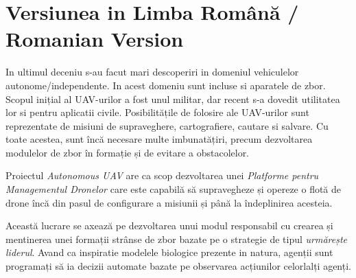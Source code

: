
\section{Versiunea in Limba Română / Romanian Version}


In ultimul deceniu s-au facut mari descoperiri in domeniul vehiculelor autonome/independente.
In acest domeniu sunt incluse si aparatele de zbor. Scopul inițial al UAV-urilor a fost unul
militar, dar recent s-a dovedit utilitatea lor si pentru aplicatii civile. Posibilitățile de 
folosire ale UAV-urilor sunt reprezentate de misiuni de 
supraveghere, cartografiere,  cautare si salvare. Cu toate acestea, 
sunt încă necesare multe imbunatățiri, precum dezvoltarea modulelor de 
zbor în formație și de evitare a obstacolelor.

Proiectul  \textit{Autonomous UAV} are ca scop dezvoltarea unei
\textit{Platforme pentru Managementul Dronelor} care este capabilă să supravegheze
și opereze o flotă de drone încă din pasul de configurare a misiunii și până la
îndeplinirea acesteia.

Această lucrare se axează pe dezvoltarea unui modul responsabil cu crearea și mentinerea
unei formații strânse de zbor bazate pe o strategie de tipul \textit{urmărește
liderul}. Avand ca inspiratie modelele biologice prezente in natura, agenții sunt programați să ia
decizii automate bazate pe observarea acțiunilor celorlalți agenți.


